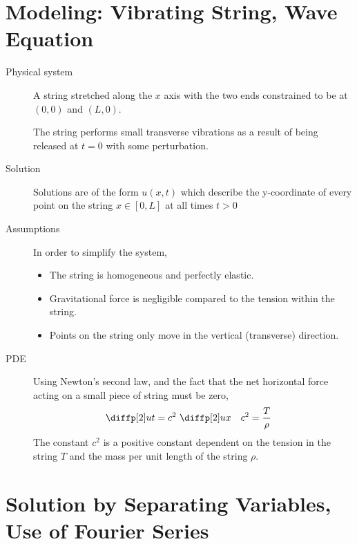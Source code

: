\section{Modeling: Vibrating String, Wave Equation}

\begin{description}
    \item[Physical system] A string stretched along the $ x $ axis with the two ends
        constrained to be at $ (0, 0) $ and $ (L, 0) $. \par
        The string performs small transverse vibrations as a result of being released at
        $ t = 0 $ with some perturbation.

    \item[Solution] Solutions are of the form $ u(x, t) $ which describe the y-coordinate
        of every point on the string  $ x \in [0, L] $ at all times $ t > 0 $

    \item[Assumptions] In order to simplify the system,
        \begin{itemize}
            \item The string is homogeneous and perfectly elastic.
            \item Gravitational force is negligible compared to the tension within the
                  string.
            \item Points on the string only move in the vertical (transverse) direction.
        \end{itemize}

    \item[PDE] Using Newton's second law, and the fact that the net horizontal force
        acting on a small piece of string must be zero,
        \begin{align}
            \diffp[2] ut & = c^2\ \diffp[2] ux & c^2 & = \frac{T}{\rho}
        \end{align}
        The constant $ c^2 $ is a positive constant dependent on the tension in the
        string $ T $ and the mass per unit length of the string $ \rho $.
\end{description}

\section{Solution by Separating Variables, Use of Fourier Series}

